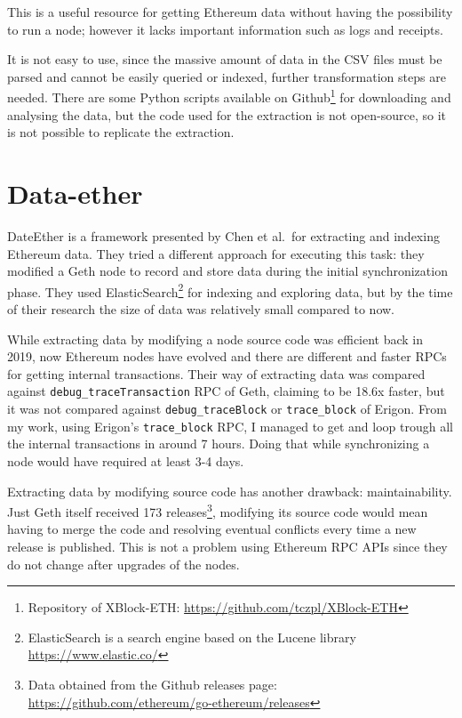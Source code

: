 This is a useful resource for getting Ethereum data without having the possibility to run a node; however it lacks important information such as logs and receipts. 

It is not easy to use, since the massive amount of data in the CSV files must be parsed and cannot be easily queried or indexed, further transformation steps are needed. There are some Python scripts available on Github\footnote{Repository of XBlock-ETH: \url{https://github.com/tczpl/XBlock-ETH}} for downloading and analysing the data, but the code used for the extraction is not open-source, so it is not possible to replicate the extraction.

\section{Data-ether}

DateEther \cite{dataether} is a framework presented by Chen et al.~for extracting and indexing Ethereum data. They tried a different approach for executing this task: they modified a Geth node to record and store data during the initial synchronization phase. They used ElasticSearch\footnote{ElasticSearch is a search engine based on the Lucene library \url{https://www.elastic.co/}} for indexing and exploring data, but by the time of their research the size of data was relatively small compared to now.

While extracting data by modifying a node source code was efficient back in 2019, now Ethereum nodes have evolved and there are different and faster RPCs for getting internal transactions. Their way of extracting data was compared against \texttt{debug\_traceTransaction} RPC of Geth, claiming to be 18.6x faster, but it was not compared against \texttt{debug\_traceBlock} or \texttt{trace\_block} of Erigon. From my work, using Erigon's \texttt{trace\_block} RPC, I managed to get and loop trough all the internal transactions in around 7 hours. Doing that while synchronizing a node would have required at least 3-4 days. 

Extracting data by modifying source code has another drawback: maintainability. Just Geth itself received 173 releases\footnote{Data obtained from the Github releases page: \url{https://github.com/ethereum/go-ethereum/releases}}, modifying its source code would mean having to merge the code and resolving eventual conflicts every time a new release is published. This is not a problem using Ethereum RPC APIs since they do not change after upgrades of the nodes.

